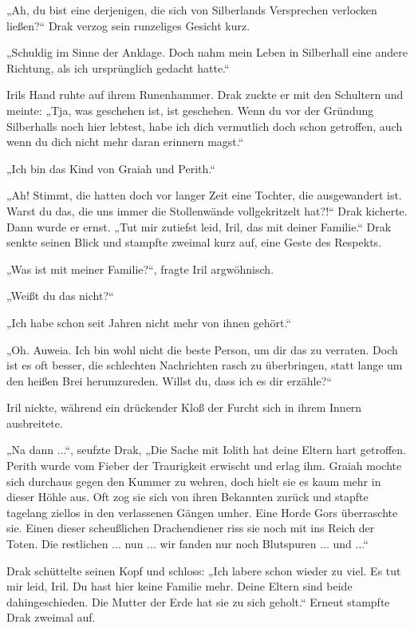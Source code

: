 „Ah, du bist eine derjenigen, die sich von Silberlands Versprechen verlocken ließen?“ Drak verzog sein runzeliges Gesicht kurz.

„Schuldig im Sinne der Anklage. Doch nahm mein Leben in Silberhall eine andere Richtung, als ich ursprünglich gedacht hatte.“

Irils Hand ruhte auf ihrem Runenhammer. Drak zuckte er mit den Schultern und meinte: „Tja, was geschehen ist, ist geschehen. Wenn du vor der Gründung Silberhalls noch hier lebtest, habe ich dich vermutlich doch schon getroffen, auch wenn du dich nicht mehr daran erinnern magst.“

„Ich bin das Kind von Graiah und Perith.“

„Ah! Stimmt, die hatten doch vor langer Zeit eine Tochter, die ausgewandert ist. Warst du das, die uns immer die Stollenwände vollgekritzelt hat?!“ Drak kicherte. Dann wurde er ernst. „Tut mir zutiefst leid, Iril, das mit deiner Familie.“ Drak senkte seinen Blick und stampfte zweimal kurz auf, eine Geste des Respekts.

„Was ist mit meiner Familie?“, fragte Iril argwöhnisch.

„Weißt du das nicht?“

„Ich habe schon seit Jahren nicht mehr von ihnen gehört.“

„Oh. Auweia. Ich bin wohl nicht die beste Person, um dir das zu verraten. Doch ist es oft besser, die schlechten Nachrichten rasch zu überbringen, statt lange um den heißen Brei herumzureden. Willst du, dass ich es dir erzähle?“

Iril nickte, während ein drückender Kloß der Furcht sich in ihrem Innern ausbreitete.

„Na dann ...“, seufzte Drak, „Die Sache mit Iolith hat deine Eltern hart getroffen. Perith wurde vom Fieber der Traurigkeit erwischt und erlag ihm. Graiah mochte sich durchaus gegen den Kummer zu wehren, doch hielt sie es kaum mehr in dieser Höhle aus. Oft zog sie sich von ihren Bekannten zurück und stapfte tagelang ziellos in den verlassenen Gängen umher. Eine Horde Gors überraschte sie. Einen dieser scheußlichen Drachendiener riss sie noch mit ins Reich der Toten. Die restlichen ... nun ... wir fanden nur noch Blutspuren ... und ...“

Drak schüttelte seinen Kopf und schloss: „Ich labere schon wieder zu viel. Es tut mir leid, Iril. Du hast hier keine Familie mehr. Deine Eltern sind beide dahingeschieden. Die Mutter der Erde hat sie zu sich geholt.“ Erneut stampfte Drak zweimal auf.

